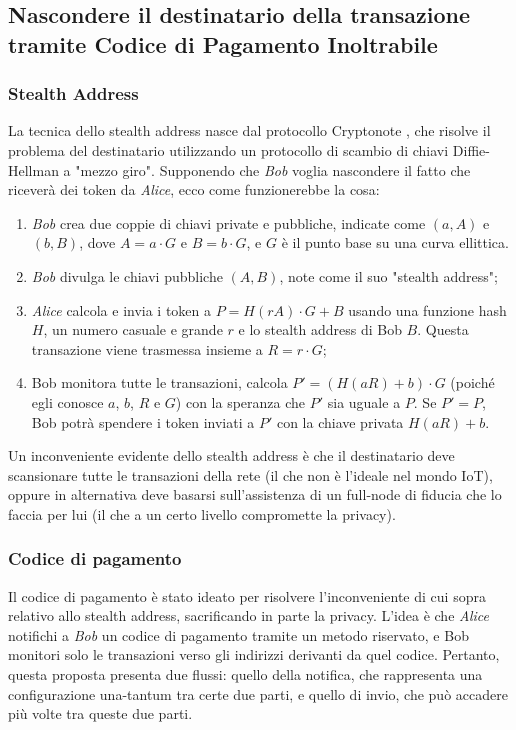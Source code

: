 \subsection{Nascondere il destinatario della transazione tramite Codice di Pagamento Inoltrabile}

\subsubsection{Stealth Address}
La tecnica dello stealth address nasce dal protocollo Cryptonote \cite{c28}, che risolve il problema del destinatario utilizzando un protocollo di scambio di chiavi Diffie-Hellman a "mezzo giro". Supponendo che \emph{Bob} voglia nascondere il fatto che riceverà dei token da \emph{Alice}, ecco come funzionerebbe la cosa:

\begin{enumerate}
	\item \emph{Bob} crea due coppie di chiavi private e pubbliche, indicate come $(a, A)$ e $(b, B)$, dove $A = a\cdot G$ e $B = b\cdot G$, e $G$ è il punto base su una curva ellittica.

	\item \emph{Bob} divulga le chiavi pubbliche $(A, B)$, note come il suo "stealth address";

	\item \emph{Alice} calcola e invia i token a $P = H (rA)\cdot G + B$ usando una funzione hash $H$, un numero casuale e grande $r$  e lo stealth address di Bob $B$. Questa transazione viene trasmessa insieme a $R = r\cdot G$;
	\item  Bob monitora tutte le transazioni, calcola $P' = (H(aR) + b)\cdot G$ (poiché egli conosce $a$, $b$, $R$ e $G$) con la speranza che $P'$ sia uguale a $P$. Se $P' = P$, Bob potrà spendere i token inviati a $P'$ con la chiave privata $H(aR) + b$.
\end{enumerate}

Un inconveniente evidente dello stealth address è che il destinatario deve scansionare tutte le transazioni della rete (il che non è l'ideale nel mondo IoT), oppure in alternativa deve basarsi sull'assistenza di un full-node di fiducia che lo faccia per lui (il che a un certo livello compromette la privacy).

\subsubsection{Codice di pagamento}
Il codice di pagamento è stato ideato per risolvere l'inconveniente di cui sopra relativo allo stealth address, sacrificando in parte la privacy. L'idea è che \emph{Alice} notifichi a \emph{Bob} un codice di pagamento tramite un metodo riservato, e Bob monitori solo le transazioni verso gli indirizzi derivanti da quel codice. Pertanto, questa proposta presenta due flussi: quello della notifica, che rappresenta una configurazione una-tantum tra certe due parti, e quello di invio, che può accadere più volte tra queste due parti.

